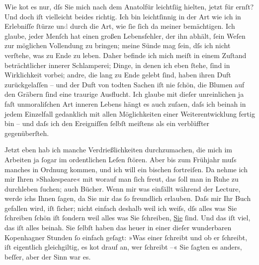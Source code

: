 \pstart
           Wie ko{\geminationm}t es nur, dſs Sie mich nach dem Anatolfür leichtſi{\geminationn}ig
               hielten, jetzt für ernſt? Und doch iſt vielleicht beides richtig. Ich bin
               leichtſinnig in der Art wie ich in Erlebniſſe{ }ſtürze un\textcolor{gray}{d}{ }\label{T_L00643-1v}\label{T_L00643-1} durch
               die Art, wie{ }ſie{ }ſich da{\geminationn} meiner bemächtigen. Ich
               glaube, jeder Menſch hat einen großen Lebensfehler, der ihn abhält,{ }ſein Weſen zur
               möglichen Vollendung zu bringen; meine Sünde mag{ }ſein, dſs ich nicht verſtehe, was zu
               Ende zu leben. Daher befinde ich mich meiſt in einem Zuſtand beträchtlicher innerer
               Schlamperei; Dinge, in denen ich eben{ }ſtehe,{ }ſind in Wirklichkeit {\pb}vorbei; andre, die lang zu Ende gelebt{ }ſind, haben
               ihren Duft zurückgelaſſen – und der Duft von todten Sachen iſt nie{ }ſchön, die Blumen
               auf den Gräbern{ }ſind eine traurige Ausflucht. Ich glaube mit dieſer unreinlichen ja
               faſt unmoraliſchen Art inneren Lebens hängt es auch zuſa\textcolor{gray}{{\geminationm}}en, daſs ich beinah in jedem Einzelfall gedanklich mit allen Möglichkeiten
               einer Weiterentwicklung fertig bin – und daſs ich den Ereigniſſen{ }ſelbſt meiſtens als
               ein verblüffter gegenüberſteh.\pend
           
\pstart
           {\pb}Jetzt eben hab ich manche Verdrießlichkeiten
               durchzumachen, die mich im Arbeiten ja{ }ſogar im ordentlichen Leſen{ }ſtören. Aber bis
               zum Frühjahr muſs manches in Ordnung kommen, und ich will ein bischen fortreiſen. Da
               nehme ich mir Ihren »Shakespeare« mit worauf man{ }ſich freut, das{ }ſoll man in Ruhe zu durchleben{ }ſuchen; auch Bücher. Wenn mir was
               einfällt während der Lecture, werde ichs Ihnen{ }ſagen, da Sie mir das{ }ſo freundlich
               erlauben. Daſs {\pb}mir Ihr Buch gefallen wird, iſt{ }ſicher; nicht einfach deshalb weil ich weiſs, dſs alles was Sie{ }ſchreiben{ }ſchön iſt{ }ſondern weil alles was Sie{ }ſchreiben, \uline{Sie}{ }ſind. Und das iſt viel, das iſt alles beinah. Sie{ }ſelbſt haben das heuer in einer dieſer wunderbaren Kopenhagner Stunden{ }ſo einfach geſagt: »Was einer{ }ſchreibt und ob er{ }ſchreibt, iſt eigentlich gleichgiltig, es ko{\geminationm}t drauf an,
               wer{ }ſchreibt –« Sie{ }ſagten es anders, beſſer, aber der Sinn {\pb}war es.\pend
           
